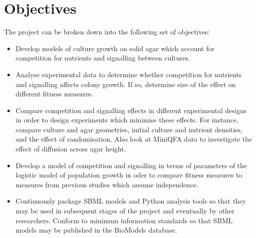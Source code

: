 
\section{Objectives}
\label{sec:objectives}
The project can be broken down into the following set of objectives:
\begin{itemize}
\item Develop models of culture growth on solid agar which account for
  competition for nutrients and signalling between cultures.
\item Analyse experimental data to determine whether competition for nutrients and signalling
  affects colony growth. If so, determine size of the effect on different fitness measures.
\item Compare competition and signalling effects in different
  experimental designs in order to design experiments which minimise
  these effects. For instance, compare culture and agar geometries,
  initial culture and nutrient densities, and the effect of randomisation. Also
  look at MiniQFA data to investigate the effect of diffusion across agar height.
\item Develop a model of competition and signalling in terms of
  parameters of the logistic model of population growth in oder to
  compare fitness measures to measures from previous studies which
  assume independence.
\item Continuously package SBML models and Python analysis tools so
  that they may be used in subsequent stages of the project and
  eventually by other researchers. Conform to minimum information standards so
  that SBML models may be published in the BioModels database.
\end{itemize}

